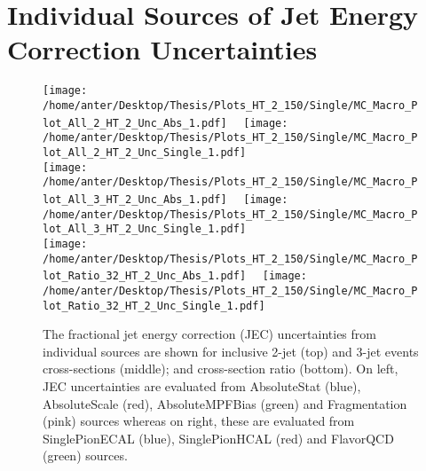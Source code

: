 \section{Individual Sources of Jet Energy Correction Uncertainties}
\label{sec:JECs}

\begin{figure}[!hbtp]
\hspace*{-5mm}\texttt{[image: /home/anter/Desktop/Thesis/Plots\_HT\_2\_150/Single/MC\_Macro\_Plot\_All\_2\_HT\_2\_Unc\_Abs\_1.pdf]}%
~~\texttt{[image: /home/anter/Desktop/Thesis/Plots\_HT\_2\_150/Single/MC\_Macro\_Plot\_All\_2\_HT\_2\_Unc\_Single\_1.pdf]}\\
\hspace*{-5mm}\texttt{[image: /home/anter/Desktop/Thesis/Plots\_HT\_2\_150/Single/MC\_Macro\_Plot\_All\_3\_HT\_2\_Unc\_Abs\_1.pdf]}%
~~\texttt{[image: /home/anter/Desktop/Thesis/Plots\_HT\_2\_150/Single/MC\_Macro\_Plot\_All\_3\_HT\_2\_Unc\_Single\_1.pdf]}\\
\hspace*{-5mm}\texttt{[image: /home/anter/Desktop/Thesis/Plots\_HT\_2\_150/Single/MC\_Macro\_Plot\_Ratio\_32\_HT\_2\_Unc\_Abs\_1.pdf]}%
~~\texttt{[image: /home/anter/Desktop/Thesis/Plots\_HT\_2\_150/Single/MC\_Macro\_Plot\_Ratio\_32\_HT\_2\_Unc\_Single\_1.pdf]}
\caption[The fractional jet energy correction (JEC) uncertainties from individual sources (Part I).]{The fractional jet energy correction (JEC) uncertainties from individual sources are shown for inclusive 2-jet (top) and 3-jet events cross-sections (middle); and cross-section ratio \ratio (bottom). On left, JEC uncertainties are evaluated from AbsoluteStat (blue), AbsoluteScale (red), AbsoluteMPFBias (green) and Fragmentation (pink) sources whereas on right, these are evaluated from SinglePionECAL (blue), SinglePionHCAL (red) and FlavorQCD (green) sources.}
\label{fig:jes1}
\end{figure}

